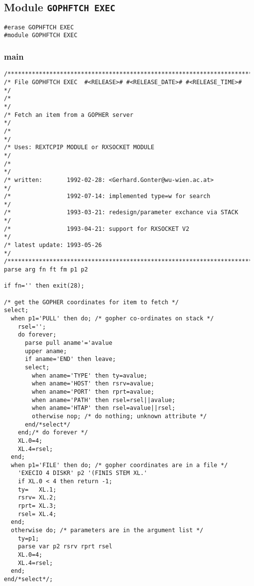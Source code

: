 \subsection{Module {\tt GOPHFTCH EXEC}}

\def\LPtopD{Module {\tt GOPHFTCH EXEC}}

\def\LPtopF{~}

\begin{verbatim}
#erase GOPHFTCH EXEC
#module GOPHFTCH EXEC
\end{verbatim}

\subsubsection{main}

\def\LPtopF{main}

\begin{verbatim}
/***********************************************************************/
/* File GOPHFTCH EXEC  #<RELEASE># #<RELEASE_DATE># #<RELEASE_TIME># */
/*                                                                     */
/* Fetch an item from a GOPHER server                                  */
/*                                                                     */
/* Uses: REXTCPIP MODULE or RXSOCKET MODULE                            */
/*                                                                     */
/* written:       1992-02-28: <Gerhard.Gonter@wu-wien.ac.at>           */
/*                1992-07-14: implemented type=w for search            */
/*                1993-03-21: redesign/parameter exchance via STACK    */
/*                1993-04-21: support for RXSOCKET V2                  */
/* latest update: 1993-05-26                                          */
/***********************************************************************/
parse arg fn ft fm p1 p2

if fn='' then exit(28);

/* get the GOPHER coordinates for item to fetch */
select;
  when p1='PULL' then do; /* gopher co-ordinates on stack */
    rsel='';
    do forever;
      parse pull aname'='avalue
      upper aname;
      if aname='END' then leave;
      select;
        when aname='TYPE' then ty=avalue;
        when aname='HOST' then rsrv=avalue;
        when aname='PORT' then rprt=avalue;
        when aname='PATH' then rsel=rsel||avalue;
        when aname='HTAP' then rsel=avalue||rsel;
        otherwise nop; /* do nothing; unknown attribute */
      end/*select*/
    end;/* do forever */
    XL.0=4;
    XL.4=rsel;
  end;
  when p1='FILE' then do; /* gopher coordinates are in a file */
    'EXECIO 4 DISKR' p2 '(FINIS STEM XL.'
    if XL.0 < 4 then return -1;
    ty=   XL.1;
    rsrv= XL.2;
    rprt= XL.3;
    rsel= XL.4;
  end;
  otherwise do; /* parameters are in the argument list */
    ty=p1;
    parse var p2 rsrv rprt rsel
    XL.0=4;
    XL.4=rsel;
  end;
end/*select*/;


\end{verbatim}
